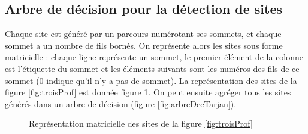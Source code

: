 \subsection{Arbre de décision pour la détection de sites}
Chaque site est généré par un parcours numérotant ses sommets, et chaque sommet a un nombre de fils bornés. On représente alors les sites sous forme matricielle : chaque ligne représente un sommet, le premier élément de la colonne est l'étiquette du sommet et les éléments suivants sont les numéros des fils de ce sommet (0 indique qu'il n'y a pas de sommet). La représentation des sites de la figure \ref{fig:troisProf} est donnée figure \ref{fig:troisProfMatRed}.
On peut ensuite agréger tous les sites générés dans un arbre de décision (figure \ref{fig:arbreDecTarjan}).

\begin{figure}
\begin{center}
\end{center}
\caption{Représentation matricielle des sites de la figure \ref{fig:troisProf}}
\label{fig:troisProfMatRed}
\end{figure}

